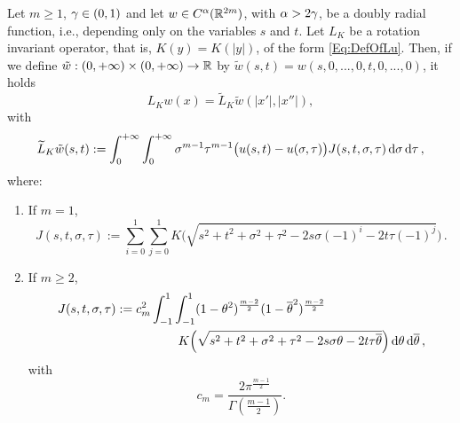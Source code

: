 \begin{lemma}
\label{Lemma:OperatorInSTVariables} Let $m \geq 1$, $\gamma\in(0,1)$ and let $w\in
C^\alpha(\mathbb{R}^{2m})$, with $\alpha > 2\gamma$, be a doubly radial function, i.e., depending only on the variables $s$ and $t$. Let $L_K$ be a rotation invariant operator, that is, $K(y) = K(|y|)$, of the form \eqref{Eq:DefOfLu}. Then, if we define $\tilde{w}:(0,+\infty)\times (0,+\infty) \to \mathbb{R}$ by $\tilde{w}(s,t) = w(s,0,...,0,t,0,...,0)$, it holds
$$ L_Kw(x) = \tilde{L}_K \tilde{w} (|x'|,|x''|), $$
with
\begin{equation*}
\label{Eq:OperatorInSTVariables}
\widetilde{L}_K \tilde{w} (s,t) := \int_0^{+\infty}  \int_0^{+\infty} \sigma^{m-1} \tau^{m-1} \big(u(s,t) - u(\sigma, \tau)\big) J(s,t,\sigma, \tau)  \,\mathrm{d} \sigma\,\mathrm{d} \tau\,,
\end{equation*}
where:
\begin{enumerate}
	\item If $m= 1$,
	\begin{equation}
		\label{Eq:KernelInSTVariablesR2}
	J(s,t,\sigma, \tau) := \sum_{i=0}^1  \sum_{j =0}^1  K\Big(\sqrt{s^2 + t^2 + \sigma^2 + \tau^2 -2 s \sigma (-1)^i -2 t \tau (-1)^j}\Big)\,.
	\end{equation}
	
	\item If $m\geq 2$,
	\begin{align}
	J(s,t,\sigma, \tau) &:= c_m ^2  \int_{-1}^1  \int_{-1}^1  (1-\theta^2)^{\frac{m-2}{2}} (1-\overline{\theta}^2)^{\frac{m-2}{2}} \nonumber\\
	& \quad \quad \quad \quad \quad
	K\Big(\sqrt{s^2 + t^2 + \sigma^2 + \tau^2 -2 s \sigma \theta -2 t \tau \overline{\theta}}\Big) \,\mathrm{d} \theta \,\mathrm{d} \overline{\theta}\,, \label{Eq:KernelSTVariables2}
	\end{align}
	with
	$$
	c_m = \dfrac{2 \pi^{\frac{m-1}{2}}}{\Gamma (\frac{m-1}{2})}.
	$$
\end{enumerate}
\end{lemma}


